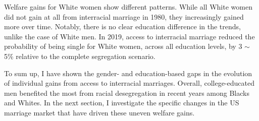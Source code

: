 Welfare gains for White women show different patterns. While all White women did not gain at all from interracial marriage in 1980, they increasingly gained more over time. Notably, there is no clear education difference in the trends, unlike the case of White men. In 2019, access to interracial marriage reduced the probability of being single for White women, across all education levels, by  3 $\sim$ 5\% relative to the complete segregation scenario. 


\vspace{3mm}
\noindent To sum up, I have shown the gender- and education-based gaps in the evolution of individual gains from access to interracial marriages. Overall, college-educated men benefited the most from racial desegregation in recent years among Blacks and Whites. In the next section, I investigate the specific changes in the US marriage market that have driven these uneven welfare gains. 





